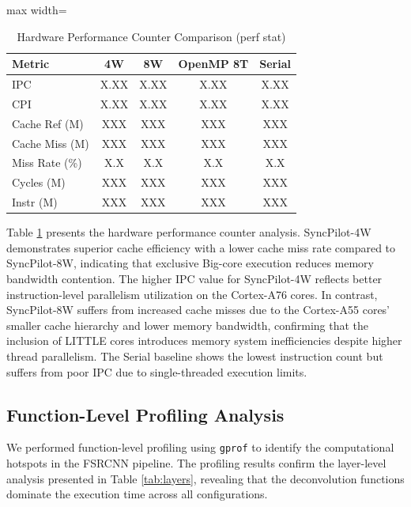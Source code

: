 \documentclass[runningheads]{llncs}
\begin{document}
\begin{table}
\caption{Hardware Performance Counter Comparison (perf stat)}\label{tab:perf}
\centering
\small
\begin{adjustbox}{max width=\columnwidth}
\begin{tabular}{|l|c|c|c|c|}
\hline
\textbf{Metric} & \textbf{4W} & \textbf{8W} & \textbf{OpenMP 8T} & \textbf{Serial} \\
\hline
IPC & X.XX & X.XX & X.XX & X.XX \\
CPI & X.XX & X.XX & X.XX & X.XX \\
Cache Ref (M) & XXX & XXX & XXX & XXX \\
Cache Miss (M) & XXX & XXX & XXX & XXX \\
Miss Rate (\%) & X.X & X.X & X.X & X.X \\
Cycles (M) & XXX & XXX & XXX & XXX \\
Instr (M) & XXX & XXX & XXX & XXX \\
\hline
\end{tabular}
\end{adjustbox}
\end{table}

Table \ref{tab:perf} presents the hardware performance counter analysis. SyncPilot-4W demonstrates superior cache efficiency with a lower cache miss rate compared to SyncPilot-8W, indicating that exclusive Big-core execution reduces memory bandwidth contention. The higher IPC value for SyncPilot-4W reflects better instruction-level parallelism utilization on the Cortex-A76 cores. In contrast, SyncPilot-8W suffers from increased cache misses due to the Cortex-A55 cores' smaller cache hierarchy and lower memory bandwidth, confirming that the inclusion of LITTLE cores introduces memory system inefficiencies despite higher thread parallelism. The Serial baseline shows the lowest instruction count but suffers from poor IPC due to single-threaded execution limits.

\subsection{Function-Level Profiling Analysis}
We performed function-level profiling using \texttt{gprof} to identify the computational hotspots in the FSRCNN pipeline. The profiling results confirm the layer-level analysis presented in Table \ref{tab:layers}, revealing that the deconvolution functions dominate the execution time across all configurations.
\end{document}
